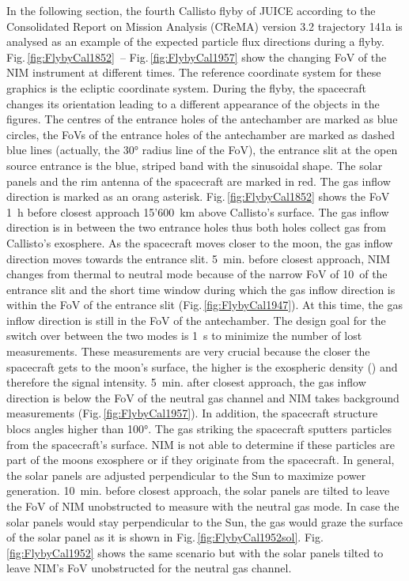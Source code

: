 	In the following section, the fourth Callisto flyby of JUICE according to the Consolidated Report on Mission Analysis (CReMA) version 3.2 trajectory 141a \cite{SOC_Crema3p2} is analysed as an example of the expected particle flux directions during a flyby. Fig.\,\ref{fig:FlybyCal1852}~-- Fig.\,\ref{fig:FlybyCal1957} show the changing FoV of the NIM instrument at different times. The reference coordinate system for these graphics is the ecliptic coordinate system. During the flyby, the spacecraft changes its orientation leading to a different appearance of the objects in the figures. The centres of the entrance holes of the antechamber are marked as blue circles, the FoVs of the entrance holes of the antechamber are marked as dashed blue lines (actually, the 30° radius line of the FoV), the entrance slit at the open source entrance is the blue, striped band with the sinusoidal shape. The solar panels and the rim antenna of the spacecraft are marked in red. The gas inflow direction is marked as an orang asterisk. Fig.\,\ref{fig:FlybyCal1852} shows the FoV 1~h before closest approach 15'600~km above Callisto's surface. The gas inflow direction is in between the two entrance holes thus both holes collect gas from Callisto's exosphere. As the spacecraft moves closer to the moon, the gas inflow direction moves towards the entrance slit. 5~min. before closest approach, NIM changes from thermal to neutral mode because of the narrow FoV of 10\degree~of the entrance slit and the short time window during which the gas inflow direction is within the FoV of the entrance slit (Fig.\,\ref{fig:FlybyCal1947}). At this time, the gas inflow direction is still in the FoV of the antechamber. The design goal for the switch over between the two modes is 1~s to minimize the number of lost measurements. These measurements are very crucial because the closer the spacecraft gets to the moon's surface, the higher is the exospheric density () and therefore the signal intensity. 5~min. after closest approach, the gas inflow direction is below the FoV of the neutral gas channel and NIM takes background measurements (Fig.\,\ref{fig:FlybyCal1957}). In addition, the spacecraft structure blocs angles higher than 100°. The gas striking the spacecraft sputters particles from the spacecraft's surface. NIM is not able to determine if these particles are part of the moons exosphere or if they originate from the spacecraft. In general, the solar panels are adjusted perpendicular to the Sun to maximize power generation. 10~min. before closest approach, the solar panels are tilted to leave the FoV of NIM unobstructed to measure with the neutral gas mode. In case the solar panels would stay perpendicular to the Sun, the gas would graze the surface of the solar panel as it is shown in Fig.\,\ref{fig:FlybyCal1952sol}. Fig.\,\ref{fig:FlybyCal1952} shows the same scenario but with the solar panels tilted to leave NIM's FoV unobstructed for the neutral gas channel.\\
